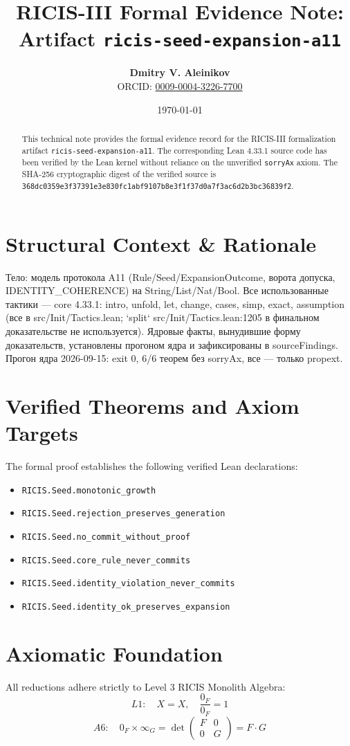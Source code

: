 \documentclass[11pt,a4paper]{article}
\title{\textbf{RICIS-III Formal Evidence Note:\\Artifact \texttt{ricis-seed-expansion-a11}}}
\author{\textbf{Dmitry V. Aleinikov}\\ORCID: \href{https://orcid.org/0009-0004-3226-7700}{0009-0004-3226-7700}}
\date{\today}
\begin{document}
\maketitle

\begin{abstract}
This technical note provides the formal evidence record for the RICIS-III formalization artifact \texttt{ricis-seed-expansion-a11}.
The corresponding Lean 4.33.1 source code has been verified by the Lean kernel without reliance on the unverified \texttt{sorryAx} axiom.
The SHA-256 cryptographic digest of the verified source is \texttt{368dc0359e3f37391e3e830fc1abf9107b8e3f1f37d0a7f3ac6d2b3bc36839f2}.
\end{abstract}

\section{Structural Context & Rationale}
Тело: модель протокола A11 (Rule/Seed/ExpansionOutcome, ворота допуска, IDENTITY_COHERENCE) на String/List/Nat/Bool. Все использованные тактики — core 4.33.1: intro, unfold, let, change, cases, simp, exact, assumption (все в src/Init/Tactics.lean; `split` src/Init/Tactics.lean:1205 в финальном доказательстве не используется). Ядровые факты, вынудившие форму доказательств, установлены прогоном ядра и зафиксированы в sourceFindings. Прогон ядра 2026-09-15: exit 0, 6/6 теорем без sorryAx, все — только propext.

\section{Verified Theorems and Axiom Targets}
The formal proof establishes the following verified Lean declarations:
\begin{itemize}
  \item \texttt{RICIS.Seed.monotonic_growth}
  \item \texttt{RICIS.Seed.rejection_preserves_generation}
  \item \texttt{RICIS.Seed.no_commit_without_proof}
  \item \texttt{RICIS.Seed.core_rule_never_commits}
  \item \texttt{RICIS.Seed.identity_violation_never_commits}
  \item \texttt{RICIS.Seed.identity_ok_preserves_expansion}
\end{itemize}

\section{Axiomatic Foundation}
All reductions adhere strictly to Level 3 RICIS Monolith Algebra:
\begin{equation}
L1: \quad X = X, \quad \frac{0_F}{0_F} = 1
\end{equation}
\begin{equation}
A6: \quad 0_F \times \infty_G = \det\begin{pmatrix} F & 0 \\ 0 & G \end{pmatrix} = F \cdot G
\end{equation}
\end{document}
